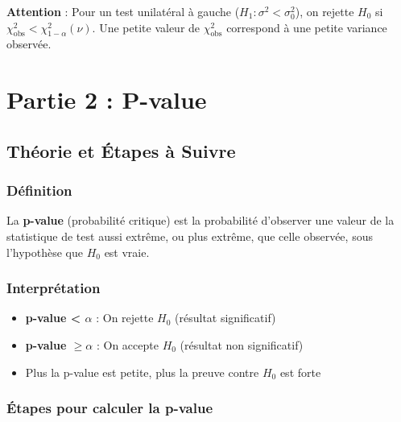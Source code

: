 \documentclass[11pt,a4paper]{article}
\newcommand{\chideux}{\chi^2}
\begin{document}
\begin{attentionbox}
\textbf{Attention} : Pour un test unilatéral à gauche ($H_1 : \sigma^2 < \sigma_0^2$), on rejette $H_0$ si $\chideux_{\text{obs}} < \chideux_{1-\alpha}(\nu)$. Une petite valeur de $\chideux_{\text{obs}}$ correspond à une petite variance observée.
\end{attentionbox}

\newpage

\section{Partie 2 : P-value}

\subsection{Théorie et Étapes à Suivre}

\subsubsection{Définition}

La \textbf{p-value} (probabilité critique) est la probabilité d'observer une valeur de la statistique de test aussi extrême, ou plus extrême, que celle observée, sous l'hypothèse que $H_0$ est vraie.

\subsubsection{Interprétation}

\begin{itemize}
    \item \textbf{p-value < $\alpha$} : On rejette $H_0$ (résultat significatif)
    \item \textbf{p-value $\geq \alpha$} : On accepte $H_0$ (résultat non significatif)
    \item Plus la p-value est petite, plus la preuve contre $H_0$ est forte
\end{itemize}

\subsubsection{Étapes pour calculer la p-value}
\end{document}
